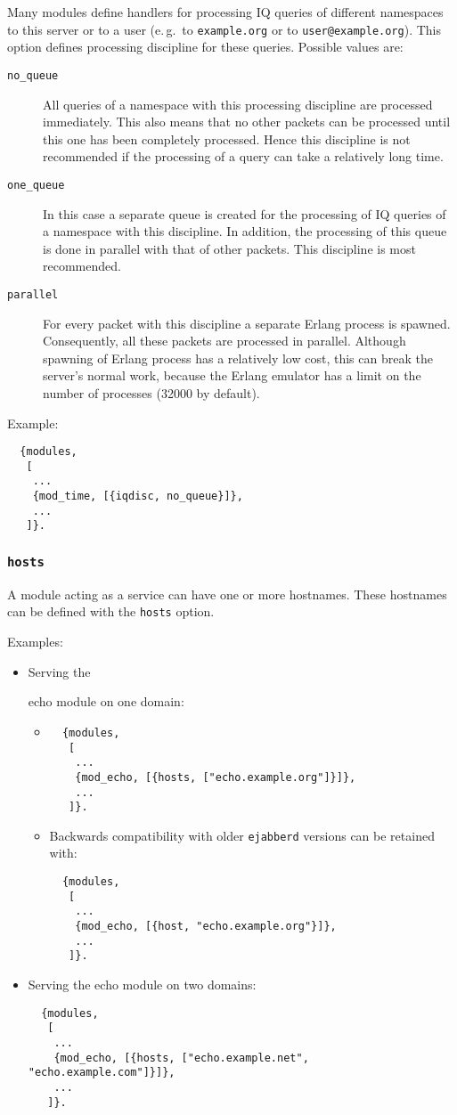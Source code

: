 \documentclass[a4paper,10pt]{article}
\newcommand{\ind}[1]{\begin{latexonly}\index{#1}\end{latexonly}}
\newcommand{\bracehack}{\def\{{\char"7B}\def\}{\char"7D}}
\newcommand{\titem}[1]{\item[\bracehack\texttt{#1}]}
\newcommand{\jid}[1]{\texttt{#1}}
\newcommand{\option}[1]{\texttt{#1}}
\newcommand{\ejabberd}{\texttt{ejabberd}}
\newcommand{\module}[1]{\texttt{#1}}
\newcommand{\modecho}{\module{mod\_echo}}
\begin{document}
Many modules define handlers for processing IQ queries of different namespaces
to this server or to a user (e.\,g.\ to \jid{example.org} or to
\jid{user@example.org}). This option defines processing discipline for
these queries. Possible values are:
\begin{description}
\titem{no\_queue} All queries of a namespace with this processing discipline are
  processed immediately. This also means that no other packets can be processed
  until this one has been completely processed. Hence this discipline is not
  recommended if the processing of a query can take a relatively long time.
\titem{one\_queue} In this case a separate queue is created for the processing
  of IQ queries of a namespace with this discipline. In addition, the processing
  of this queue is done in parallel with that of other packets. This discipline
  is most recommended.
\titem{parallel} For every packet with this discipline a separate Erlang process
  is spawned. Consequently, all these packets are processed in parallel.
  Although spawning of Erlang process has a relatively low cost, this can break
  the server's normal work, because the Erlang emulator has a limit on the
  number of processes (32000 by default).
\end{description}

Example:
\begin{verbatim}
  {modules,
   [
    ...
    {mod_time, [{iqdisc, no_queue}]},
    ...
   ]}.
\end{verbatim}

\subsubsection{\option{hosts}}
\label{modhostsoption}
\ind{options!hosts}

A module acting as a service can have one or more hostnames. These hostnames
can be defined with the \option{hosts} option.

Examples:
\begin{itemize}
\item Serving the \ind{modules!\modecho{}}echo module on one domain:
  \begin{itemize}
  \item
    \begin{verbatim}
  {modules,
   [
    ...
    {mod_echo, [{hosts, ["echo.example.org"]}]},
    ...
   ]}.
\end{verbatim}
  \item Backwards compatibility with older \ejabberd{} versions can be retained
    with:
    \begin{verbatim}
  {modules,
   [
    ...
    {mod_echo, [{host, "echo.example.org"}]},
    ...
   ]}.
\end{verbatim}
  \end{itemize}
  \item Serving the echo module on two domains:
    \begin{verbatim}
  {modules,
   [
    ...
    {mod_echo, [{hosts, ["echo.example.net", "echo.example.com"]}]},
    ...
   ]}.
\end{verbatim}
\end{itemize}
\end{document}
